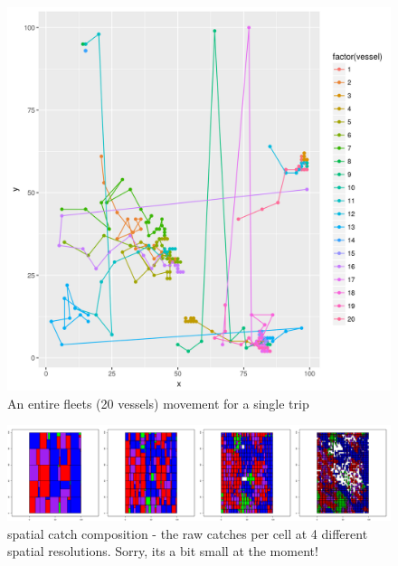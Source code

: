 \documentclass[review]{elsarticle}
\begin{document}
\begin{figure}[!ht]
	\includegraphics[width = \linewidth]{../tests/plots/fleet_moves}
	\caption{An entire fleets (20 vessels) movement for a single trip}
	\label{fig:7}
\end{figure}	

\begin{figure}[!ht]
	\includegraphics[width = \linewidth]{../tests/plots/catch_comp}
	\caption{spatial catch composition - the raw catches per cell at 4
		different spatial resolutions. Sorry, its a bit small at the
		moment!}
	\label{fig:8}
\end{figure}	
\end{document}
